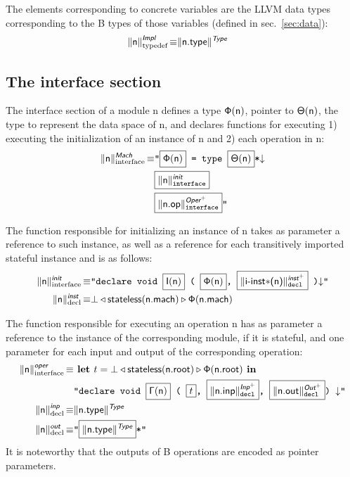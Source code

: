 \documentclass{llncs}
\newcommand{\trad}[2]{\ensuremath{\lVert \textsf{#1} \rVert^{\textit{#2}}}}
\newcommand{\nl}[0]{\ensuremath{\downarrow}}
\DeclareMathOperator{\isdef}{\equiv}
\newcommand{\llvm}[1]{\texttt{#1}}
\newcommand{\B}[1]{\textsf{#1}}
\newcommand{\ListOf}[1]{$\mbox{#1}^+$}
\newcommand{\LET}[0]{\textbf{ let }}
\newcommand{\IN}[0]{\textbf{ in }}
\newcommand{\PH}[1]{\framebox{$#1$}}
\newcommand{\Global}[0]{\ensuremath{\sf\Gamma}}
\newcommand{\stateless}[0]{\ensuremath{\textsf{stateless}}}
\newcommand{\trimportedinstances}[0]{\ensuremath{\textsf{i-inst$\mathsf{\ast}$}}}
\newcommand{\state}[0]{\ensuremath{\sf\Theta}}
\newcommand{\stateref}[0]{\ensuremath{\sf\Phi}}
\newcommand{\init}[0]{\ensuremath{\mathsf{I}}}
\begin{document}
\begin{enumerate}
The elements corresponding to concrete variables are the LLVM data types
corresponding to the B types of those variables (defined in
sec.~\ref{sec:data}):
\begin{align*}
  \trad{\B{n}}{\B{Impl}}_{\text{typedef}} \isdef 
  & \trad{\B{n.type}}{\B{Type}}
\end{align*}

\subsection{The interface section}

The interface section of a module \B{n} defines a type $\stateref(\B{n})$,
pointer to $\state(\B{n})$, the type to represent the data space of \B{n}, and
declares functions for executing 1) executing the initialization of an instance
of \B{n} and 2) each operation in \B{n}:
\begin{align*}
  \trad{\B{n}}{\B{Mach}}_{\text{interface}} \isdef 
  & \llvm{"\PH{\stateref(\B{n})} = type \PH{\state(\B{n})}*\nl} \\
  & \llvm{\PH{\trad{\B{n}}{\B{init}}_{\text{interface}}}}\\
  & \llvm{\PH{\trad{\B{n.op}}{\ListOf{\B{Oper}}}_{\text{interface}}}"}
\end{align*}

The function responsible for initializing an instance of \B{n} takes as
parameter a reference to such instance, as well as a reference for each
transitively imported stateful instance and is as follows:
\begin{align*}
  \trad{\B{n}}{\B{init}}_{\text{interface}} \isdef 
  & \llvm{"declare void \PH{\init(\B{n})} ( \PH{\stateref(\B{n})}, 
    \PH{\trad{\trimportedinstances(\B{n})}{\ListOf{\B{inst}}}_{\text{decl}}} )\nl"} \\
  \trad{\B{n}}{\B{inst}}_{\text{decl}} \isdef 
  & \bot \triangleleft \stateless(\B{n.mach}) \triangleright \stateref(\B{n.mach}) 
\end{align*}

The function responsible for executing an operation \B{n} has as parameter a
reference to the instance of the corresponding module, if it is stateful, and
one parameter for each input and output of the corresponding operation:
\begin{align*}
  \trad{\B{n}}{\B{oper}}_{\text{interface}} \isdef 
  & 
\LET t = \bot \triangleleft \stateless(\B{n.root}) \triangleright \stateref(\B{n.root}) \IN \\
& \llvm{"declare void \PH{\Global(\B{n})} 
( \PH{t}, 
  \PH{\trad{\B{n.inp}}{\ListOf{\B{Inp}}}_{\text{decl}}}, 
  \PH{\trad{\B{n.out}}{\ListOf{\B{Out}}}_{\text{decl}}}) \nl"} \\
  \trad{\B{n}}{\B{inp}}_{\text{decl}} \isdef & \trad{\B{n.type}}{\B{Type}} \\
  \trad{\B{n}}{\B{out}}_{\text{decl}} \isdef & \llvm{"\PH{\trad{\B{n.type}}{\B{Type}}}*"}
\end{align*}
It is noteworthy that the outputs of B operations are encoded as pointer
parameters.

\end{enumerate}
\end{document}
